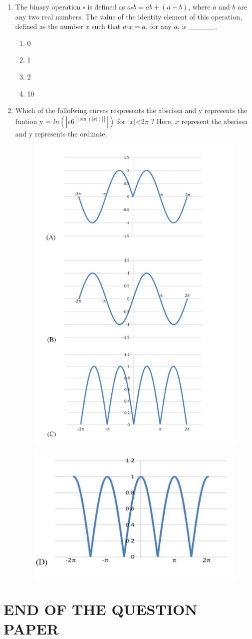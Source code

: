 \documentclass[journal,12pt,onecolumn]{IEEEtran}
\theoremstyle{remark}
\begin{document}
\begin{enumerate}
\item The binary operation $\square$ is defined as $a \square b = ab +(a+b)$, where $a$ and $b$ are any two real numbers. The value of the identity element of this operation, defined as the number $x$ such that $a \square x = a$, for any $a$, is \_\_\_\_\_.
\begin{multicols}{2}
\begin{enumerate}
    \item 0
    \item 1
    \item 2
    \item 10
\end{enumerate}
\end{multicols}
\item Which of the follofwing curves respresents the abscissa and y represents the funtion y = $ln(|e6^{[|\sin(|x|)|]}|)$ for $|x|$<2$\pi$ ?
Here,  $x$ represent the abscissa and y represents the ordinate.
\begin{figure}[H]
    \centering
    \includegraphics[width = 0.3\columnwidth]{fig/Q10(1).png}
    \caption*{}
    \label{fig:Q10(1)}
\end{figure}
\begin{figure}[H]
    \centering
    \includegraphics[width = 0.2\columnwidth]{fig/Q10(2).png}
    \caption*{}
    \label{fig:Q10(2)}
\end{figure}
\end{enumerate}
\section*{\textbf{END OF THE QUESTION PAPER} }
\end{document}
